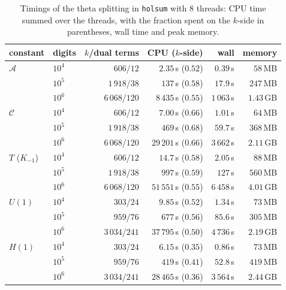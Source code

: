 \documentclass[11pt]{amsart}
\theoremstyle{definition}
\theoremstyle{remark}
\begin{document}
\begin{table}[tp]
\centering\small
\begin{tabular}{llrrrr}
\toprule
constant & digits & $k$/dual terms & CPU ($k$-side) & wall & memory \\
\midrule
$\mathcal A$ & $10^4$ & $606$/$12$ & $2.35$\,s ($0.52$) & $0.39$\,s & $58$\,MB \\
 & $10^5$ & $1\,918$/$38$ & $137$\,s ($0.58$) & $17.9$\,s & $247$\,MB \\
 & $10^6$ & $6\,068$/$120$ & $8\,435$\,s ($0.55$) & $1\,063$\,s & $1.43$\,GB \\
\midrule
$\mathcal C$ & $10^4$ & $606$/$12$ & $7.00$\,s ($0.66$) & $1.01$\,s & $64$\,MB \\
 & $10^5$ & $1\,918$/$38$ & $469$\,s ($0.68$) & $59.7$\,s & $368$\,MB \\
 & $10^6$ & $6\,068$/$120$ & $29\,201$\,s ($0.66$) & $3\,662$\,s & $2.11$\,GB \\
\midrule
$T$ ($K_{-1}$) & $10^4$ & $606$/$12$ & $14.7$\,s ($0.58$) & $2.05$\,s & $88$\,MB \\
 & $10^5$ & $1\,918$/$38$ & $997$\,s ($0.59$) & $127$\,s & $560$\,MB \\
 & $10^6$ & $6\,068$/$120$ & $51\,551$\,s ($0.55$) & $6\,458$\,s & $4.01$\,GB \\
\midrule
$U(1)$ & $10^4$ & $303$/$24$ & $9.85$\,s ($0.52$) & $1.34$\,s & $73$\,MB \\
 & $10^5$ & $959$/$76$ & $677$\,s ($0.56$) & $85.6$\,s & $305$\,MB \\
 & $10^6$ & $3\,034$/$241$ & $37\,795$\,s ($0.50$) & $4\,736$\,s & $2.19$\,GB \\
\midrule
$H(1)$ & $10^4$ & $303$/$24$ & $6.15$\,s ($0.35$) & $0.86$\,s & $73$\,MB \\
 & $10^5$ & $959$/$76$ & $419$\,s ($0.41$) & $52.8$\,s & $419$\,MB \\
 & $10^6$ & $3\,034$/$241$ & $28\,465$\,s ($0.36$) & $3\,564$\,s & $2.44$\,GB \\
\bottomrule
\end{tabular}
\vspace{\abovecaptionskip}
\caption{Timings of the theta splitting in \texttt{holsum} with $8$ threads: CPU time summed over the threads, with
the fraction spent on the $k$-side in parentheses, wall time and peak memory.}
\label{tab:apps}

\bigskip


\end{table}
\end{document}
